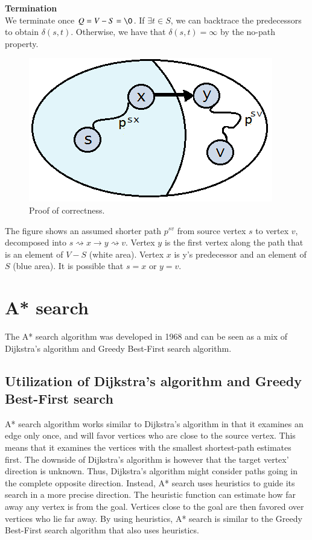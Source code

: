 \documentclass[11pt]{article}
\begin{document}
\noindent \textbf{Termination}\\
We terminate once $Q = V-S =\O$. If $\exists t \in S$, we can backtrace the predecessors to obtain $\delta(s,t)$. Otherwise, we have that $\delta(s,t) = \infty$ by the no-path property.\\

\begin{figure}[H]
\centering
\includegraphics[scale=0.5]{Pictures/Dijkstra - Proof of correctness.png}
\caption{Proof of correctness.}
\label{fig:eyy}
\end{figure}

\noindent The figure shows an assumed shorter path $p^{sv}$ from source vertex $s$ to vertex $v$, decomposed into $s\rightsquigarrow x\rightarrow y \rightsquigarrow v$. Vertex $y$ is the first vertex along the path that is an element of $V-S$ (white area). Vertex $x$ is y's predecessor and an element of $S$ (blue area). It is possible that $s=x$ or $y=v$.

\newpage
\section{A* search}
The A* search algorithm was developed in 1968 and can be seen as a mix of Dijkstra's algorithm and Greedy Best-First search algorithm. 

\subsection{Utilization of Dijkstra's algorithm and Greedy Best-First search}
\noindent A* search algorithm works similar to Dijkstra's algorithm in that it examines an edge only once, and will favor vertices who are close to the source vertex. This means that it examines the vertices with the smallest shortest-path estimates first. The downside of Dijkstra's algorithm is however that the target vertex' direction is unknown. Thus, Dijkstra's algorithm might consider paths going in the complete opposite direction. Instead, A* search uses heuristics to guide its search in a more precise direction. The heuristic function can estimate how far away any vertex is from the goal. Vertices close to the goal are then favored over vertices who lie far away. By using heuristics, A* search is similar to the Greedy Best-First search algorithm that also uses heuristics.\\
\end{document}
